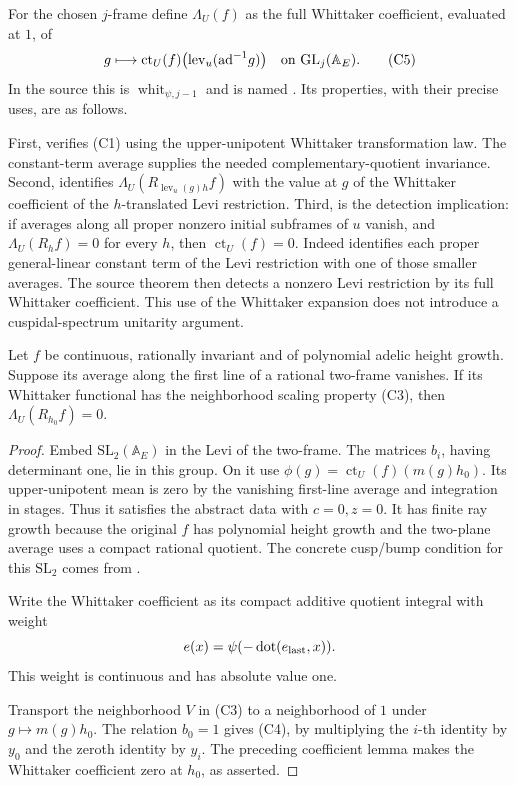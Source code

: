 For the chosen \(j\)-frame define \(\Lambda_U(f)\) as the full
Whittaker coefficient, evaluated at \(1\), of
\[
       g\longmapsto
          \operatorname{ct}_U(f)\bigl(\operatorname{lev}_u
                                      (\mathrm{ad}^{-1}g)\bigr)
                \quad\hbox{on }\mathrm{GL}_j(\mathbb A_E).
 \tag{C5}\label{eq:sr-source-whittaker-of-average}
\]
In the source this is
\(\operatorname{whit}_{\psi,j-1}\) and is named .
Its properties, with their precise uses, are as follows.

First,  verifies (C1) using the upper-unipotent
Whittaker transformation law. The constant-term average
supplies the needed complementary-quotient invariance.
Second,  identifies
\(\Lambda_U(R_{\operatorname{lev}_u(g)h}f)\) with the value
at \(g\) of the Whittaker coefficient of the \(h\)-translated
Levi restriction.
Third,  is the detection implication:
if averages along all proper nonzero initial subframes
of \(u\) vanish, and \(\Lambda_U(R_hf)=0\) for every \(h\),
then \(\operatorname{ct}_U(f)=0\).
Indeed  identifies each proper general-linear
constant term of the Levi restriction with one of those
smaller averages. The source theorem 
then detects a nonzero Levi restriction by its full Whittaker
coefficient. This use of the Whittaker expansion does not
introduce a cuspidal-spectrum unitarity argument.

\begin{srlemma}
\label{lem:sr-source-wh-two}
Let \(f\) be continuous, rationally invariant and of polynomial
adelic height growth. Suppose its average along the first
line of a rational two-frame vanishes.
If its Whittaker functional has the neighborhood scaling
property (C3), then \(\Lambda_U(R_{h_0}f)=0\).
\end{srlemma}

\begin{proof}
Embed \(\mathrm{SL}_2(\mathbb A_E)\) in the Levi of the two-frame.
The matrices \(b_i\), having determinant one, lie in this group.
On it use
\(\phi(g)=\operatorname{ct}_U(f)(m(g)h_0)\).
Its upper-unipotent mean is zero by the vanishing first-line
average and integration in stages.
Thus it satisfies the abstract data with \(c=0,z=0\).
It has finite ray growth because the original \(f\) has
polynomial height growth and the two-plane average uses a
compact rational quotient.
The concrete cusp/bump condition for this \(\mathrm{SL}_2\)
comes from .

Write the Whittaker coefficient as its compact additive
quotient integral with weight
\[
                 e(x)=\psi(-\operatorname{dot}(e_{\rm last},x)).
\]
This weight is continuous and has absolute value one.

Transport the neighborhood \(V\) in (C3) to a neighborhood
of \(1\) under \(g\mapsto m(g)h_0\).
The relation \(b_0=1\) gives (C4), by multiplying the
\(i\)-th identity by \(y_0\) and the zeroth identity
by \(y_i\). The preceding coefficient lemma makes the
Whittaker coefficient zero at \(h_0\), as asserted.
\end{proof}

